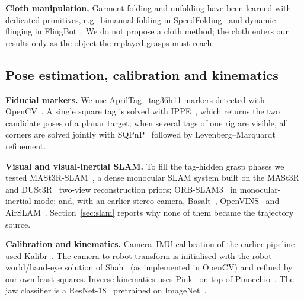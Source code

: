 \documentclass[conference,10pt]{IEEEtran}
\begin{document}
\textbf{Cloth manipulation.} Garment folding and unfolding have been learned with dedicated primitives, e.g.\ bimanual
folding in SpeedFolding~\cite{avigal2022speedfolding} and dynamic flinging in FlingBot~\cite{ha2021flingbot}. We do not
propose a cloth method; the cloth enters our results only as the object the replayed grasps must reach.

\subsection{Pose estimation, calibration and kinematics}
\textbf{Fiducial markers.} We use AprilTag~\cite{olson2011apriltag,wang2016apriltag2} tag36h11 markers detected with
OpenCV~\cite{bradski2000opencv}. A single square tag is solved with IPPE~\cite{collins2014ippe}, which returns the two
candidate poses of a planar target; when several tags of one rig are visible, all corners are solved jointly with
SQPnP~\cite{terzakis2020sqpnp} followed by Levenberg--Marquardt refinement.

\textbf{Visual and visual-inertial SLAM.} To fill the tag-hidden grasp phases we tested
MASt3R-SLAM~\cite{murai2025mast3rslam}, a dense monocular SLAM system built on the MASt3R~\cite{leroy2024mast3r} and
DUSt3R~\cite{wang2024dust3r} two-view reconstruction priors; ORB-SLAM3~\cite{campos2021orbslam3} in monocular-inertial mode;
and, with an earlier stereo camera, Basalt~\cite{usenko2020basalt}, OpenVINS~\cite{geneva2020openvins} and
AirSLAM~\cite{xu2025airslam}. Section~\ref{sec:slam} reports why none of them became the trajectory source.

\textbf{Calibration and kinematics.} Camera--IMU calibration of the earlier pipeline used Kalibr~\cite{furgale2013kalibr}.
The camera-to-robot transform is initialised with the robot-world/hand-eye solution of Shah~\cite{shah2013robotworld} (as
implemented in OpenCV) and refined by our own least squares. Inverse kinematics uses Pink~\cite{pink} on top of
Pinocchio~\cite{carpentier2019pinocchio}. The jaw classifier is a ResNet-18~\cite{he2016resnet} pretrained on
ImageNet~\cite{deng2009imagenet}.

\end{document}
